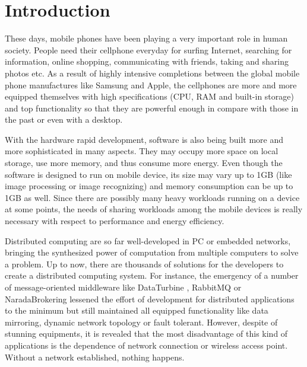 \documentclass[conference]{IEEEtran}
\begin{document}
%
\IEEEpeerreviewmaketitle



\section{Introduction}
These days, mobile phones have been playing a very important role in human society. People need their cellphone everyday for surfing Internet, searching for information, online shopping, communicating with friends, taking and sharing photos etc. As a result of highly intensive completions between the global mobile phone manufactures like Samsung and Apple, the cellphones are more and more equipped themselves with high specifications (CPU, RAM and built-in storage) and top functionality so that they are powerful enough in compare with those in the past or even with a desktop. 

With the hardware rapid development, software is also being built more and more sophisticated in many aspects. They may occupy more space on local storage, use more memory, and thus consume more energy. Even though the software is designed to run on mobile device, its size may vary up to 1GB (like image processing or image recognizing) and memory consumption can be up to 1GB as well. Since there are possibly many heavy workloads running on a device at some points, the needs of sharing workloads among the mobile devices is really necessary with respect to performance and energy efficiency. 

Distributed computing are so far well-developed in PC or embedded networks, bringing the synthesized power of computation from multiple computers to solve a problem. Up to now, there are thousands of solutions for the developers to create a distributed computing system. For instance, the emergency of a number of message-oriented middleware like DataTurbine \cite{rbnb}, RabbitMQ \cite{rabbitmq} or NaradaBrokering \cite{naradabrokering} lessened the effort of development for distributed applications to the minimum but still maintained all equipped functionality like data mirroring, dynamic network topology or fault tolerant. However, despite of stunning equipments, it is revealed that the most disadvantage of this kind of applications is the dependence of network connection or wireless access point. Without a network established, nothing happens.
\end{document}
